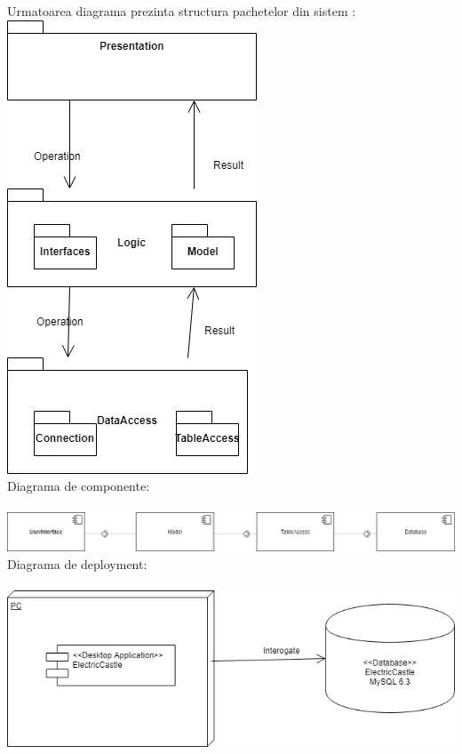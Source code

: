 \documentclass[11pt,a4paper,twoside,notitlepage]{article}
\begin{document}
Urmatoarea diagrama prezinta structura pachetelor din sistem :
\newpage
\includegraphics[height=.4\textheight]{Packages} \\ 
Diagrama de componente: \\
\\
\includegraphics[width=.6\textheight]{Component} \\
Diagrama de deployment: \\
\\
\includegraphics[width=.6\textheight]{Deployment} \\
\end{document}
